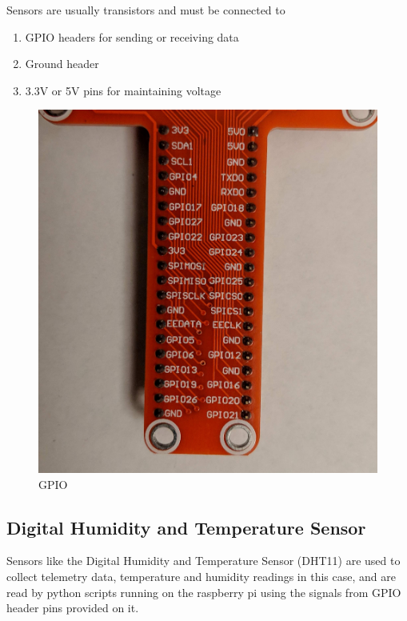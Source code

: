 \documentclass[11pt,openright]{report}
\begin{document}
Sensors are usually transistors and must be connected to
\begin{enumerate}
\item GPIO headers for sending or receiving data
\item  Ground header 
\item  3.3V or 5V pins for maintaining voltage
\end{enumerate}

\begin{figure}
	\centering
	\includegraphics[scale=0.1]{images/gpiopins.jpg}
	\caption{GPIO}
	\label{fig:gpio_pins}
\end{figure}

\subsection{Digital Humidity and Temperature Sensor}
Sensors like the Digital Humidity and Temperature Sensor (DHT11) are used to collect telemetry data, temperature and humidity readings in this case, and are read by python scripts running on the raspberry pi using the signals from GPIO header pins provided on it.
\end{document}
